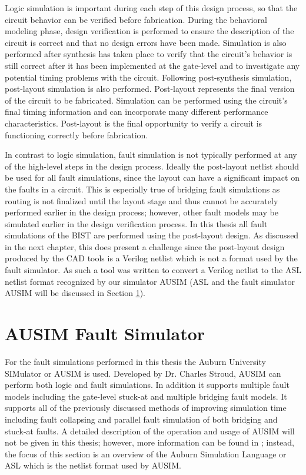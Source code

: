 \documentclass[12pt]{report}
\begin{document}
Logic simulation is important during each step of this design process, so that the circuit behavior can be verified before fabrication\cite{advancedverilog}.  During the behavioral modeling phase, design verification is performed to ensure the description of the circuit is correct and that no design errors have been made.  Simulation is also performed after synthesis has taken place to verify that the circuit's behavior is still correct after it has been implemented at the gate-level and to investigate any potential timing problems with the circuit\cite{advancedverilog}.  Following post-synthesis simulation, post-layout simulation is also performed.  Post-layout represents the final version of the circuit to be fabricated.  Simulation can be performed using the circuit's final timing information and can incorporate many different performance characteristics.  Post-layout is the final opportunity to verify a circuit is functioning correctly before fabrication\cite{advancedverilog}.

In contrast to logic simulation, fault simulation is not typically performed at any of the high-level steps in the design process\cite{stroud}.  Ideally the post-layout netlist should be used for all fault simulations, since the layout can have a significant impact on the faults in a circuit\cite{defectforcmos}.  This is especially true of bridging fault simulations as routing is not finalized until the layout stage and thus cannot be accurately performed earlier in the design process\cite{defectforcmos}; however, other fault models may be simulated earlier in the design verification process\cite{stroud}.  In this thesis all fault simulations of the BIST are performed using the post-layout design.  As discussed in the next chapter, this does present a challenge since the post-layout design produced by the CAD tools is a Verilog netlist which is not a format used by the fault simulator.  As such a tool was written to convert a Verilog netlist to the ASL netlist format recognized by our simulator AUSIM (ASL and the fault simulator AUSIM will be discussed in Section \ref{sct:ausim}).

\section{AUSIM Fault Simulator}
\label{sct:ausim}
For the fault simulations performed in this thesis the Auburn University SIMulator or AUSIM is used.  Developed by Dr. Charles Stroud\cite{ausim}\cite{asl}, AUSIM can perform both logic and fault simulations.  In addition it supports multiple fault models including the gate-level stuck-at and multiple bridging fault models\cite{ausim}.  It supports all of the previously discussed methods of improving simulation time including fault collapsing and parallel fault simulation of both bridging and stuck-at faults\cite{ausim}.  A detailed description of the operation and usage of AUSIM will not be given in this thesis; however, more information can be found in \cite{ausim}\cite{asl}; instead, the focus of this section is an overview of the Auburn Simulation Language or ASL which is the netlist format used by AUSIM.
\end{document}
